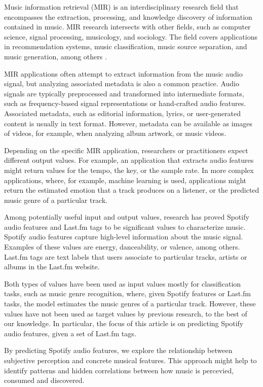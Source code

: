 \documentclass[sn-mathphys]{sn-jnl}%
\theoremstyle{thmstyleone}%
\theoremstyle{thmstyletwo}%
\theoremstyle{thmstylethree}%
\begin{document}
Music information retrieval (MIR) is an interdisciplinary research field that encompasses the extraction,
processing, and knowledge discovery of information contained in music.
MIR research intersects with other fields, such as computer science, signal processing, musicology, and sociology.
The field covers applications in recommendation systems, music classification,
music source separation, and music generation, among others \cite{ramirez2020machine}.

MIR applications often attempt to extract information from the music audio signal,
but analyzing associated metadata is also a common practice.
Audio signals are typically preprocessed and transformed into intermediate formats, such as frequency-based signal representations or hand-crafted audio features.
Associated metadata, such as editorial information, lyrics, or user-generated content is usually in text format.
However, metadata can be available as images of videos, for example, when analyzing album artwork, or music videos.

Depending on the specific MIR application, researchers or practitioners expect different output values.
For example, an application that extracts audio features might return values for the tempo, the key, or the sample rate.
In more complex applications, where, for example, machine learning is used,
applications might return the estimated emotion that a track produces on a listener, or the predicted music genre of a particular track.

Among potentially useful input and output values, research has proved Spotify audio features and Last.fm tags to be significant values to characterize music.
Spotify audio features capture high-level information about the music signal.
Examples of these values are energy, danceability, or valence, among others.
Last.fm tags are text labels that users associate to particular tracks, artists or albums in the Last.fm website.

Both types of values have been used as input values mostly for classification tasks, such as music genre recognition,
where, given Spotify features or Last.fm tasks, the model estimates the music genres of a particular track.
However, these values have not been used as target values by previous research, to the best of our knowledge.
In particular, the focus of this article is on predicting Spotify audio features, given a set of Last.fm tags.

By predicting Spotify audio features, we explore the relationship between subjective perception and concrete musical features.
This approach might help to identify patterns and hidden correlations between how music is percevied, consumed and discovered.
\end{document}
